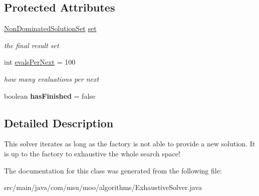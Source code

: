 \subsection*{Protected Attributes}
\begin{DoxyCompactItemize}
\item 
\hypertarget{classcom_1_1msu_1_1moo_1_1algorithms_1_1ExhaustiveSolver_3_01V_01extends_01IVariable_00_01P_01extends_01IProblem_01_4_a71615fa157f4d181101547c59d553e81}{\hyperlink{classcom_1_1msu_1_1moo_1_1model_1_1solution_1_1NonDominatedSolutionSet}{Non\-Dominated\-Solution\-Set} \hyperlink{classcom_1_1msu_1_1moo_1_1algorithms_1_1ExhaustiveSolver_3_01V_01extends_01IVariable_00_01P_01extends_01IProblem_01_4_a71615fa157f4d181101547c59d553e81}{set}}\label{classcom_1_1msu_1_1moo_1_1algorithms_1_1ExhaustiveSolver_3_01V_01extends_01IVariable_00_01P_01extends_01IProblem_01_4_a71615fa157f4d181101547c59d553e81}

\begin{DoxyCompactList}\small\item\em the final result set \end{DoxyCompactList}\item 
\hypertarget{classcom_1_1msu_1_1moo_1_1algorithms_1_1ExhaustiveSolver_3_01V_01extends_01IVariable_00_01P_01extends_01IProblem_01_4_a43dc999ee116079db5279c329eac8d82}{int \hyperlink{classcom_1_1msu_1_1moo_1_1algorithms_1_1ExhaustiveSolver_3_01V_01extends_01IVariable_00_01P_01extends_01IProblem_01_4_a43dc999ee116079db5279c329eac8d82}{evals\-Per\-Next} = 100}\label{classcom_1_1msu_1_1moo_1_1algorithms_1_1ExhaustiveSolver_3_01V_01extends_01IVariable_00_01P_01extends_01IProblem_01_4_a43dc999ee116079db5279c329eac8d82}

\begin{DoxyCompactList}\small\item\em how many evaluations per next \end{DoxyCompactList}\item 
\hypertarget{classcom_1_1msu_1_1moo_1_1algorithms_1_1ExhaustiveSolver_3_01V_01extends_01IVariable_00_01P_01extends_01IProblem_01_4_a13de3b464a86a794e2177a16cf24fe07}{boolean {\bfseries has\-Finished} = false}\label{classcom_1_1msu_1_1moo_1_1algorithms_1_1ExhaustiveSolver_3_01V_01extends_01IVariable_00_01P_01extends_01IProblem_01_4_a13de3b464a86a794e2177a16cf24fe07}

\end{DoxyCompactItemize}


\subsection{Detailed Description}
This solver iterates as long as the factory is not able to provide a new solution. It is up to the factory to exhaustive the whole search space! 

The documentation for this class was generated from the following file\-:\begin{DoxyCompactItemize}
\item 
src/main/java/com/msu/moo/algorithms/Exhaustive\-Solver.\-java\end{DoxyCompactItemize}
